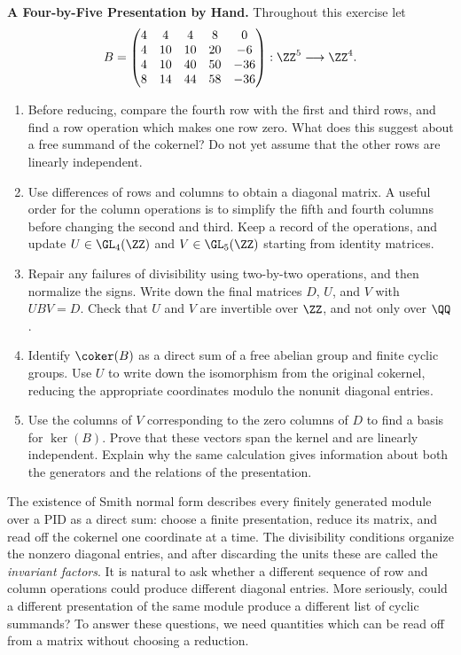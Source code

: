 \documentclass[12pt,reqno]{amsart}
\begin{document}
\hrulefill

\begin{problems}
\item\label{s:fourbyfive} \textbf{A Four-by-Five Presentation by Hand.} Throughout this exercise let
\[
B=\begin{pmatrix}
4&4&4&8&0\\
4&10&10&20&-6\\
4&10&40&50&-36\\
8&14&44&58&-36
\end{pmatrix}:\ZZ^5\longrightarrow\ZZ^4.
\]
\begin{enumerate}
\item Before reducing, compare the fourth row with the first and third rows, and find a row operation which makes one row zero. What does this suggest about a free summand of the cokernel? Do not yet assume that the other rows are linearly independent.
\item Use differences of rows and columns to obtain a diagonal matrix. A useful order for the column operations is to simplify the fifth and fourth columns before changing the second and third. Keep a record of the operations, and update $U\in\GL_4(\ZZ)$ and $V\in\GL_5(\ZZ)$ starting from identity matrices.
\item Repair any failures of divisibility using two-by-two operations, and then normalize the signs. Write down the final matrices $D$, $U$, and $V$ with $UBV=D$. Check that $U$ and $V$ are invertible over $\ZZ$, and not only over $\QQ$.
\item Identify $\coker(B)$ as a direct sum of a free abelian group and finite cyclic groups. Use $U$ to write down the isomorphism from the original cokernel, reducing the appropriate coordinates modulo the nonunit diagonal entries.
\item Use the columns of $V$ corresponding to the zero columns of $D$ to find a basis for $\ker(B)$. Prove that these vectors span the kernel and are linearly independent. Explain why the same calculation gives information about both the generators and the relations of the presentation.
\end{enumerate}
\end{problems}

\hrulefill

The existence of Smith normal form describes every finitely generated module over a PID as a direct sum: choose a finite presentation, reduce its matrix, and read off the cokernel one coordinate at a time. The divisibility conditions organize the nonzero diagonal entries, and after discarding the units these are called the \emph{invariant factors}. It is natural to ask whether a different sequence of row and column operations could produce different diagonal entries. More seriously, could a different presentation of the same module produce a different list of cyclic summands? To answer these questions, we need quantities which can be read off from a matrix without choosing a reduction.
\end{document}
